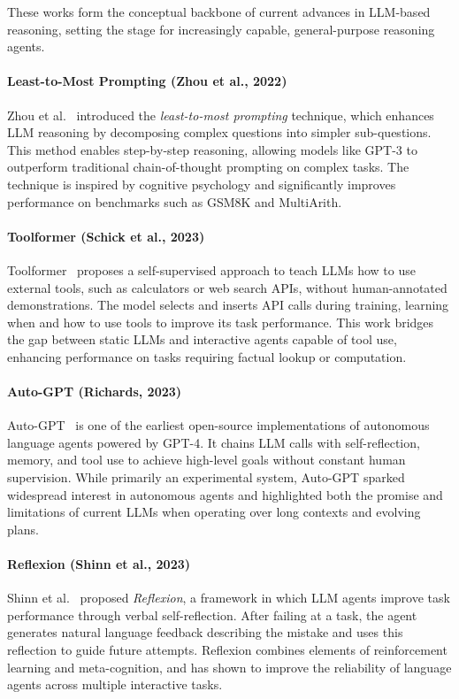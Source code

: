 These works form the conceptual backbone of current advances in LLM-based reasoning, setting the stage for increasingly capable, general-purpose reasoning agents.

\paragraph{Least-to-Most Prompting (Zhou et al., 2022)}  
Zhou et al.~\cite{zhou2022least} introduced the \emph{least-to-most prompting} technique, which enhances LLM reasoning by decomposing complex questions into simpler sub-questions. This method enables step-by-step reasoning, allowing models like GPT-3 to outperform traditional chain-of-thought prompting on complex tasks. The technique is inspired by cognitive psychology and significantly improves performance on benchmarks such as GSM8K and MultiArith.

\paragraph{Toolformer (Schick et al., 2023)}  
Toolformer~\cite{schick2023toolformer} proposes a self-supervised approach to teach LLMs how to use external tools, such as calculators or web search APIs, without human-annotated demonstrations. The model selects and inserts API calls during training, learning when and how to use tools to improve its task performance. This work bridges the gap between static LLMs and interactive agents capable of tool use, enhancing performance on tasks requiring factual lookup or computation.

\paragraph{Auto-GPT (Richards, 2023)}  
Auto-GPT~\cite{torantulino2023autogpt} is one of the earliest open-source implementations of autonomous language agents powered by GPT-4. It chains LLM calls with self-reflection, memory, and tool use to achieve high-level goals without constant human supervision. While primarily an experimental system, Auto-GPT sparked widespread interest in autonomous agents and highlighted both the promise and limitations of current LLMs when operating over long contexts and evolving plans.

\paragraph{Reflexion (Shinn et al., 2023)}  
Shinn et al.~\cite{shinn2023reflexion} proposed \emph{Reflexion}, a framework in which LLM agents improve task performance through verbal self-reflection. After failing at a task, the agent generates natural language feedback describing the mistake and uses this reflection to guide future attempts. Reflexion combines elements of reinforcement learning and meta-cognition, and has shown to improve the reliability of language agents across multiple interactive tasks.
